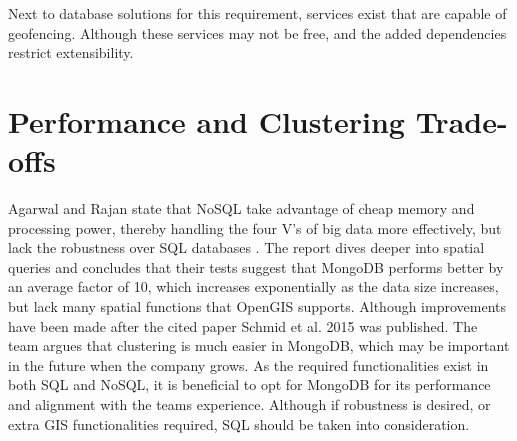 Next to database solutions for this requirement, services exist that are capable of geofencing. Although these services may not be free, and the added dependencies restrict extensibility.

%
\section{Performance and Clustering Trade-offs}
Agarwal and Rajan state that NoSQL take advantage of cheap memory and processing power, thereby handling the four V’s of big data more effectively,
but lack the robustness over SQL databases . The report dives deeper into spatial queries and concludes that their tests suggest that MongoDB performs better by an average factor of 10, which increases exponentially as the data size increases, but lack many spatial functions that OpenGIS supports. Although improvements have been made  after the cited paper Schmid et al. 2015  was published. The team argues that clustering is much easier in MongoDB, which may be important in the future when the company grows. As the required functionalities exist in both SQL and NoSQL, it is beneficial to opt for MongoDB for its performance and alignment with the teams experience. Although if robustness is desired, or extra GIS functionalities required, SQL should be taken into consideration.
